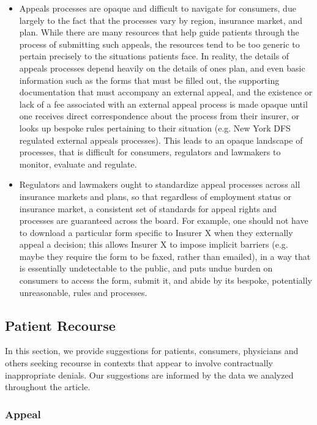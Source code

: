 \documentclass[12pt, a4paper,twoside,parskip=full]{report}
\theoremstyle{plain} %
\theoremstyle{definition} %
\theoremstyle{remark} %
\numberwithin{equation}{chapter}
\begin{document}
		\begin{itemize}
			\item Appeals processes are opaque and difficult to navigate for consumers, due largely to the fact that the processes vary by region, insurance market, and plan. While there are many resources that help guide patients through the process of submitting such appeals, the resources tend to be too generic to pertain precisely to the situations patients face. In reality, the details of appeals processes depend heavily on the details of ones plan, and even basic information such as the forms that must be filled out, the supporting documentation that must accompany an external appeal, and the existence or lack of a fee associated with an external appeal process is made opaque until one receives direct correspondence about the process from their insurer, or looks up bespoke rules pertaining to their situation (e.g. New York DFS regulated external appeals processes). This leads to an opaque landscape of processes, that is difficult for consumers, regulators and lawmakers to monitor, evaluate and regulate.
			
			\item Regulators and lawmakers ought to standardize appeal processes across all insurance markets and plans, so that regardless of employment status or insurance market, a consistent set of standards for appeal rights and processes are guaranteed across the board. For example, one should not have to download a particular form specific to Insurer X when they externally appeal a decision; this allows Insurer X to impose implicit barriers (e.g. maybe they require the form to be faxed, rather than emailed), in a way that is essentially undetectable to the public, and puts undue burden on consumers to access the form, submit it, and abide by its bespoke, potentially unreasonable, rules and processes.
		\end{itemize}
		
		\subsection{Patient Recourse}
		
		In this section, we provide suggestions for patients, consumers, physicians and others seeking recourse in contexts that appear to involve contractually inappropriate denials. Our suggestions are informed by the data we analyzed throughout the article.
		
		\subsubsection{Appeal}
		
\end{document}
